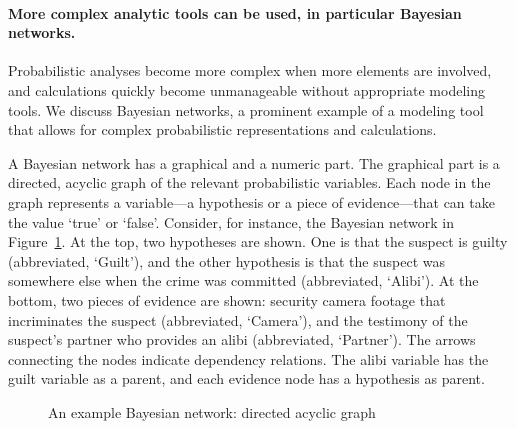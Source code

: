 \documentclass[10pt]{article}
\begin{document}
\paragraph{%
More complex analytic tools can be used, in particular Bayesian networks.} 
Probabilistic analyses become more complex when more elements are involved, 
and calculations quickly become unmanageable without appropriate modeling tools. 
We discuss Bayesian networks, 
a prominent example of a modeling tool that allows for complex probabilistic representations and calculations.

A Bayesian network has a graphical and a numeric part. The graphical part is a directed, acyclic graph of the relevant probabilistic variables. 
Each node in the graph represents a variable---a hypothesis or a piece of evidence---that 
can take the value `true' or `false'. 
Consider, for instance, the Bayesian network in Figure~\ref{fig:BN}. At the top, two hypotheses are shown. One is that the suspect is guilty (abbreviated, `Guilt'), and 
the other hypothesis is that the suspect was somewhere else when the crime was committed (abbreviated, `Alibi').  %
At the bottom, two pieces of evidence are shown: security camera footage that incriminates the suspect (abbreviated, `Camera'), and the testimony of the suspect's partner 
who provides an alibi (abbreviated, `Partner'). 
The arrows connecting the nodes indicate dependency relations. %
The alibi variable has the guilt variable as a parent, and 
each evidence node has a hypothesis as parent. 

\begin{figure}[t]
\centering

\caption{An example Bayesian network: directed acyclic graph\label{fig:BN}}
\end{figure}
\end{document}

